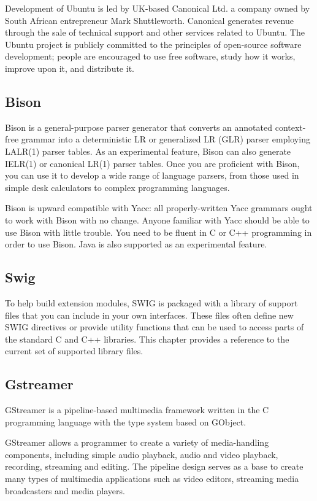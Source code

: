 \documentclass[12pt,a4paper,oneside]{memoir}
\begin{document}
Development of Ubuntu is led by UK-based Canonical Ltd. a company owned by South African entrepreneur Mark Shuttleworth. Canonical generates revenue through the sale of technical support and other services related to Ubuntu. The Ubuntu project is publicly committed to the principles of open-source software development; people are encouraged to use free software, study how it works, improve upon it, and distribute it.\\
\subsection{Bison}
Bison is a general-purpose parser generator that converts an annotated context-free grammar into a deterministic LR or generalized LR (GLR) parser employing LALR(1) parser tables. As an experimental feature, Bison can also generate IELR(1) or canonical LR(1) parser tables. Once you are proficient with Bison, you can use it to develop a wide range of language parsers, from those used in simple desk calculators to complex programming languages.

Bison is upward compatible with Yacc: all properly-written Yacc grammars ought to work with Bison with no change. Anyone familiar with Yacc should be able to use Bison with little trouble. You need to be fluent in C or C++ programming in order to use Bison. Java is also supported as an experimental feature.\\

\subsection{Swig}
To help build extension modules, SWIG is packaged with a library of support files that you can include in your own interfaces. These files often define new SWIG directives or provide utility functions that can be used to access parts of the standard C and C++ libraries. This chapter provides a reference to the current set of supported library files.\\

\subsection{Gstreamer} 
GStreamer is a pipeline-based multimedia framework written in the C programming language with the type system based on GObject.

GStreamer allows a programmer to create a variety of media-handling components, including simple audio playback, audio and video playback, recording, streaming and editing. The pipeline design serves as a base to create many types of multimedia applications such as video editors, streaming media broadcasters and media players.
\end{document}
